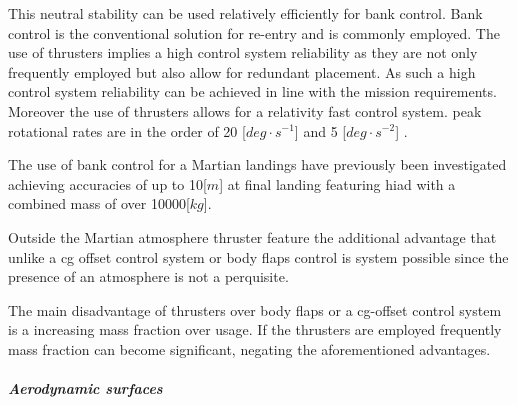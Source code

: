 This neutral stability can be used relatively efficiently for bank control. Bank control is the conventional solution for re-entry and is commonly employed. The use of thrusters implies a high control system reliability \cite{Wertz2011} as they are not only frequently employed but also allow for redundant placement. As such a high control system reliability can be achieved in line with the mission requirements. Moreover the use of thrusters allows for a relativity fast control system. peak rotational rates are in the order of 20 [$deg\cdot s^{-1}$] and 5 [$deg \cdot s^{-2}$] \cite{Davis2010}.

The use of bank control for a Martian landings have previously been investigated \cite{Davis2010} achieving accuracies of up to 10[$m$] at final landing featuring \gls{hiad} with a combined mass of over 10000[$kg$].

Outside the Martian atmosphere thruster feature the additional advantage that unlike a \gls{cg} offset control system or body flaps control is system possible since the presence of an atmosphere is not a perquisite.

The main disadvantage of thrusters over body flaps or a \gls{cg}-offset control system is a increasing mass fraction over usage. If the thrusters are employed frequently mass fraction can become significant, negating the aforementioned advantages.


\subparagraph{Aerodynamic surfaces}


